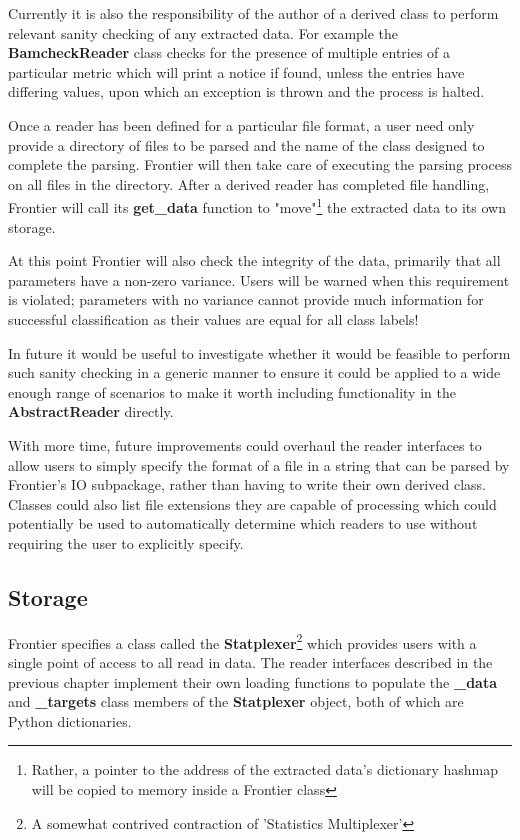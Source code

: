 Currently it is also the responsibility of the author of a derived class to
perform relevant sanity checking of any extracted data. For example the
\textbf{BamcheckReader} class checks for the presence of multiple entries of a
particular metric which will print a notice if found, unless the entries have
differing values, upon which an exception is thrown and the process is halted.

Once a reader has been defined for a particular file format, a user need only
provide a directory of files to be parsed and the name of the class designed to
complete the parsing. Frontier will then take care of executing the parsing
process on all files in the directory. After a derived reader has completed file
handling, Frontier will call its \textbf{get\_data} function to
"move"\footnote{Rather, a pointer to the address of the extracted data's
dictionary hashmap will be copied to memory inside a Frontier class} the
extracted data to its own storage.

At this point Frontier will also check the integrity of the data, primarily that
all parameters have a non-zero variance. Users will be warned when this
requirement is violated; parameters with no variance cannot provide much
information for successful classification as their values are equal for all
class labels!

In future it would be useful to investigate whether it would be feasible to
perform such sanity checking in a generic manner to ensure it could be applied
to a wide enough range of scenarios to make it worth including functionality in
the \textbf{AbstractReader} directly.

With more time, future improvements could overhaul the reader interfaces
to allow users to simply specify the format of a file in a string that can be
parsed by Frontier's IO subpackage, rather than having to write their own derived
class. Classes could also list file extensions they are capable of processing
which could potentially be used to automatically determine which readers to use
without requiring the user to explicitly specify.


\subsection{Storage}

Frontier specifies a class called the \textbf{Statplexer}\footnote{A somewhat
contrived contraction of 'Statistics Multiplexer'} which provides users with a
single point of access to all read in data. The reader interfaces described in
the previous chapter implement their own loading functions to populate the
\textbf{\_data} and \textbf{\_targets} class members of the \textbf{Statplexer}
object, both of which are Python dictionaries.


